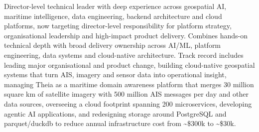 \vspace{0.25cm}

\begin{cvparagraph}

Director-level technical leader with deep experience across geospatial AI, maritime intelligence, data engineering, backend architecture and cloud platforms, now targeting director-level responsibility for platform strategy, organisational leadership and high-impact product delivery. Combines hands-on technical depth with broad delivery ownership across AI/ML, platform engineering, data systems and cloud-native architecture. Track record includes leading major organisational and product change, building cloud-native geospatial systems that turn AIS, imagery and sensor data into operational insight, managing Theia as a maritime domain awareness platform that merges 30 million square km of satellite imagery with 500 million AIS messages per day and other data sources, overseeing a cloud footprint spanning 200 microservices, developing agentic AI applications, and redesigning storage around PostgreSQL and parquet/duckdb to reduce annual infrastructure cost from \textasciitilde\$300k to \textasciitilde\$30k.
\end{cvparagraph}
